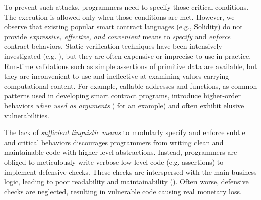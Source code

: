 To prevent such attacks, programmers need to specify those critical
conditions. The execution is allowed only when those conditions are met.
However, we observe that existing popular smart contract languages (e.g.,
Solidity) do not provide \emph{expressive, effective, and convenient} means to
\emph{specify} and \emph{enforce} contract behaviors.
Static verification techniques have been intensively investigated (e.g. \cite{DBLP:journals/pacmpl/AlbertGRRRS20,
DBLP:journals/pacmpl/SmaragdakisGLTT21, DBLP:journals/pacmpl/SmaragdakisGLTT21, DBLP:journals/pacmpl/TanMLDF22}),
but they are often expensive or imprecise \cite{rice1953classes} to use in practice.
Run-time validations such as simple assertions of primitive data are available, 
but they are inconvenient to use and ineffective at 
examining values carrying computational content. %
For example, callable addresses and functions, as common patterns used in developing
smart contract programs, introduce higher-order behaviors \emph{when used as arguments} %
( for an example) and often exhibit elusive vulnerabilities. %


The lack of \textit{sufficient  linguistic means} to modularly specify and enforce 
subtle and critical behaviors discourages programmers from writing clean and maintainable
code with higher-level abstractions.
Instead, programmers are obliged to meticulously write verbose low-level code (e.g. assertions)
to implement defensive checks. These checks are interspersed with the main business logic,
 leading to poor readability and maintainability 
().
Often worse, defensive checks are neglected, resulting in
vulnerable code causing real monetary loss.

